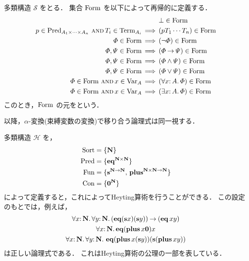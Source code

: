 \documentclass[./main]{subfiles}
\begin{document}
\begin{ziphildefi}
多類構造 $ \mathscr{S} $ をとる．
集合 $ \mathop{\mathrm{Form}}\nolimits $ を以下によって再帰的に定義する．
\begin{align*}
& \hphantom{{} \fLongrightarrow {}} \bot \in \op{Form} \\
p \in \op{Pred} _{A _1 \times \cdots \times A _n} \fwland T _i \in \op{Term} _{A _i} & \fLongrightarrow (p T _1 \cdots T _n) \in \op{Form} \\
\varPhi \in \op{Form} & \fLongrightarrow (\lnot \varPhi) \in \op{Form} \\
\varPhi, \varPsi \in \op{Form} & \fLongrightarrow (\varPhi \bto \varPsi) \in \op{Form} \\
\varPhi, \varPsi \in \op{Form} & \fLongrightarrow (\varPhi \land \varPsi) \in \op{Form} \\
\varPhi, \varPsi \in \op{Form} & \fLongrightarrow (\varPhi \lor \varPsi) \in \op{Form} \\
\varPhi \in \op{Form} \fwland x \in \op{Var} _A & \fLongrightarrow (\forall x \ocl\, A.\, \varPhi) \in \op{Form} \\
\varPhi \in \op{Form} \fwland x \in \op{Var} _A & \fLongrightarrow (\exists x \ocl\, A.\, \varPhi) \in \op{Form}
\end{align*}
このとき，$ \mathop{\mathrm{Form}}\nolimits $ の元をという．
\end{ziphildefi}

以降，$ \alpha $-変換(束縛変数の変換)で移り合う論理式は同一視する．

多類構造 $ \mathscr{H} $ を，
\begin{align*}
\mathop{\mathrm{Sort}}\nolimits & = \{ \mathbf{N} \} \\
\mathop{\mathrm{Pred}}\nolimits & = \{ \mathop{\mathbf{eq}}\nolimits ^{\mathbf{N} \times \mathbf{N}} \} \\
\mathop{\mathrm{Fun}}\nolimits & = \{ \mathbf{s} ^{\mathbf{N} \to \mathbf{N}},\, \mathop{\mathbf{plus}}\nolimits ^{\mathbf{N} \times \mathbf{N} \to \mathbf{N}} \} \\
\mathop{\mathrm{Con}}\nolimits & = \{ \mathbf{0} ^{\mathbf{N}} \}
\end{align*}
によって定義すると，これによってHeyting算術を行うことができる．
この設定のもとでは，例えば，
\begin{gather*}
\forall x \mathord{:}\, \mathbf{N}.\, \forall y \mathord{:}\, \mathbf{N}.\, (\mathop{\mathbf{eq}}\nolimits (\mathbf{s} x) (\mathbf{s} y)) \mathbin{\to} (\mathop{\mathbf{eq}}\nolimits xy) \\
\forall x \mathord{:}\, \mathbf{N}.\, {\mathop{\mathbf{eq}}\nolimits (\mathop{\mathbf{plus}}\nolimits x \mathbf{0}) x} \\
\forall x \mathord{:}\, \mathbf{N}.\, \forall y \mathord{:}\, \mathbf{N}.\, \mathop{\mathbf{eq}}\nolimits (\mathop{\mathbf{plus}}\nolimits x (\mathbf{s} y)) (\mathbf{s} (\mathop{\mathbf{plus}}\nolimits x y))
\end{gather*}
は正しい論理式である．
これはHeyting算術の公理の一部を表している．
\end{document}
